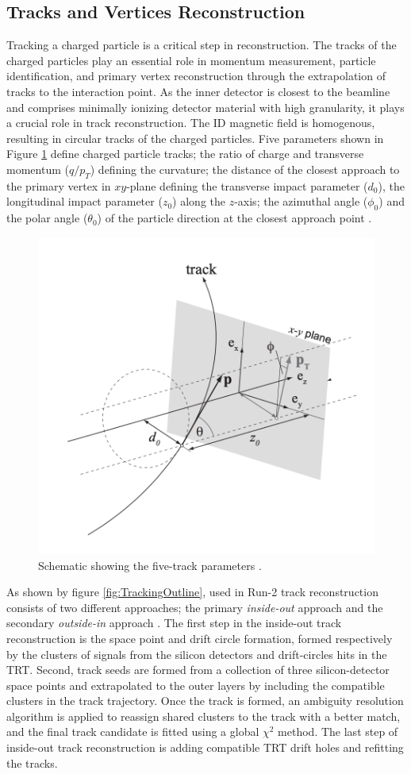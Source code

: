 \subsection{Tracks and Vertices Reconstruction}
\label{subsec:Tracking}
Tracking a charged particle is a critical step in reconstruction. The tracks of the charged particles play an essential role in momentum measurement, particle identification, and primary vertex reconstruction through the extrapolation of tracks to the interaction point. As the inner detector is closest to the beamline and comprises minimally ionizing detector material with high granularity, it plays a crucial role in track reconstruction. The ID magnetic field is homogenous, resulting in circular tracks of the charged particles. Five parameters shown in Figure \ref{fig:TrackParameter} define charged particle tracks; the ratio of charge and transverse momentum ($q/p_{T}$) defining the curvature; the distance of the closest approach to the primary vertex in $xy$-plane defining the transverse impact parameter ($d_{0}$), the longitudinal impact parameter ($z_{0}$) along the $z$-axis; the azimuthal angle ($\phi_{0}$) and the polar angle ($\theta_{0}$) of the particle direction at the closest approach point \cite{TrackingRun2_ATLAS}. 

\begin{figure}
    \centering
    \includegraphics[width=.6\linewidth]{figures/LHC/TrackParameters.png}
    \caption{ Schematic showing the five-track parameters \cite{TrackParameterFig}.\label{fig:TrackParameter}}
\end{figure}

As shown by figure \ref{fig:TrackingOutline}, used in Run-2 track reconstruction consists of two different approaches; the primary \textit{inside-out} approach and the secondary \textit{outside-in} approach \cite{TrackingRun2_ATLAS}. The first step in the inside-out track reconstruction is the space point and drift circle formation, formed respectively by the clusters of signals from the silicon detectors and drift-circles hits in the TRT. Second, track seeds are formed from a collection of three silicon-detector space points and extrapolated to the outer layers by including the compatible clusters in the track trajectory. Once the track is formed, an ambiguity resolution algorithm is applied to reassign shared clusters to the track with a better match, and the final track candidate is fitted using a global $\chi^{2}$ method. The last step of inside-out track reconstruction is adding compatible TRT drift holes and refitting the tracks. 

